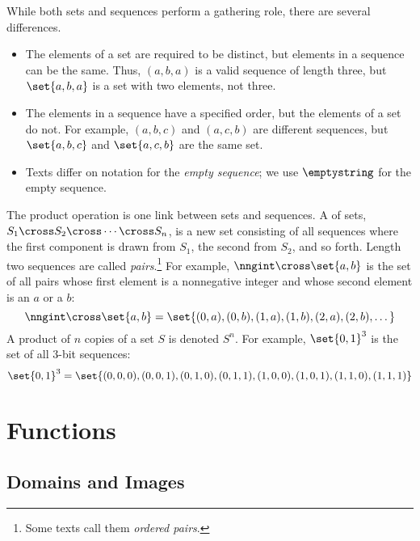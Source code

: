 While both sets and sequences perform a gathering role, there are
several differences.
\begin{itemize}

\item The elements of a set are required to be distinct, but elements in a
sequence can be the same.  Thus, $(a, b, a)$ is a valid sequence of length
three, but $\set{a, b, a}$ is a set with two elements, not three.

\item The elements in a sequence have a specified order, but the
  elements of a set do not.  For example, $(a, b, c)$ and $(a, c, b)$
  are different sequences, but $\set{a, b, c}$ and $\set{a, c, b}$ are
  the same set.

\item Texts differ on notation for the \emph{empty sequence};%
   we use $\emptystring$ for the empty
  sequence.
\end{itemize}

The product operation is one link between sets and sequences.  A
 of sets, $S_1 \cross S_2 \cross \cdots \cross
S_n$, is a new set consisting of all sequences where the first
component is drawn from $S_1$, the second from $S_2$, and so forth.
Length two sequences are called \emph{pairs}.\footnote{Some texts call
  them \emph{ordered pairs}.}  For example, $\nngint \cross
\set{a,b}$ is the set of all pairs whose first element is a
nonnegative integer and whose second element is an $a$ or a $b$:
\[
\nngint \cross \set{a,b}
    = \set{(0,a), (0,b), (1,a), (1,b), (2,a), (2, b), \dots}
\]
A product of $n$ copies of a set $S$ is denoted $S^n$.  For example,
$\set{0, 1}^3$ is the set of all $3$-bit sequences:
\[
\set{0, 1}^3 = \set{ (0,0,0), (0,0,1), (0,1,0), (0,1,1),
                     (1,0,0), (1,0,1), (1,1,0), (1,1,1) }
\]

\begin{problems}

\homeworkproblems
{}
\end{problems}


\section{Functions}\label{funcsubsec}


\subsection{Domains and Images}

